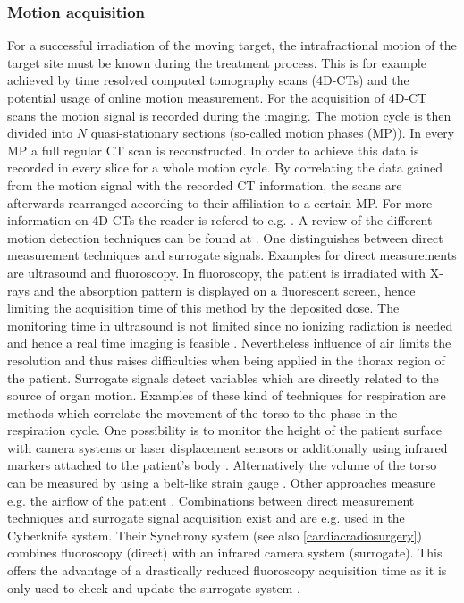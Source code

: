 \subsubsection{Motion acquisition}
\label{Motionacq}
For a successful irradiation of the moving target, the intrafractional motion of the target site must be known during the treatment process. 
This is for example achieved by time resolved computed tomography scans (4D-CTs) and the potential usage of online motion measurement.\newline
\newline
For the acquisition of 4D-CT scans the motion signal is recorded during the imaging. The motion cycle is then divided into $N$ quasi-stationary 
sections (so-called motion phases (MP)). In every MP a full regular CT scan is reconstructed. In order to achieve this data is recorded in every 
slice for a whole motion cycle. By correlating the data gained from the motion signal with the recorded CT information, the 
scans are afterwards rearranged according to their affiliation to a certain MP. For more information on 4D-CTs the reader is refered to 
e.g. \cite{Rie05}.\newline
\newline 
A review of the different motion detection techniques can be found at \cite{Eva08}. 
One distinguishes between direct measurement techniques and surrogate signals. Examples for direct measurements are ultrasound and 
fluoroscopy. In fluoroscopy, the patient is irradiated with X-rays and the absorption pattern is displayed on a fluorescent screen, hence 
limiting the acquisition time of this method by the deposited dose. The monitoring time in ultrasound is not limited since no ionizing radiation 
is needed and hence a real time imaging is feasible \cite{Pra12}. Nevertheless influence of air limits the resolution and thus raises 
difficulties when being applied in the thorax region of the patient. Surrogate signals detect variables which are directly related to the 
source of organ motion. Examples of these kind of techniques for respiration are methods which correlate the movement of the torso to the 
phase in the respiration cycle. One possibility is to monitor the height of the patient surface with camera systems or laser 
displacement sensors or additionally using infrared markers attached to the patient's body \cite{Tad98, Ber05, Schw04, Ser13}. 
Alternatively the volume of the torso can be measured by using a belt-like strain gauge \cite{Li06}. Other approaches measure e.g. the airflow 
of the patient \cite{Kub96, Hanl99}.\newline
\newline
Combinations between direct measurement techniques and surrogate signal acquisition exist and are e.g. used in the 
Cyberknife system. Their Synchrony system (see also \ref{cardiacradiosurgery}) combines fluoroscopy (direct) with an infrared camera 
system (surrogate). This offers the advantage of a drastically reduced fluoroscopy acquisition time as it is only used to check and 
update the surrogate system \cite{Sha10, Lue12}.

